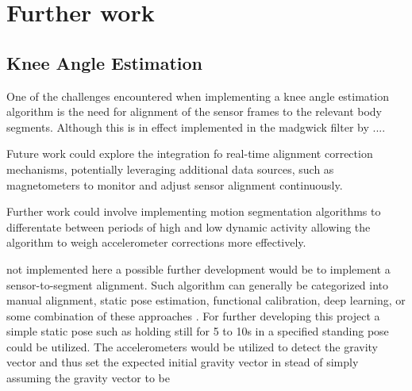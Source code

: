 
\section{Further work}

\subsection{Knee Angle Estimation}
One of the challenges encountered when implementing a knee angle estimation algorithm is the need for alignment of the sensor frames to the relevant body segments. Although this is in effect implemented in the madgwick filter by ....

Future work could explore the integration fo real-time alignment correction mechanisms, potentially leveraging additional data sources, such as magnetometers to monitor and adjust sensor alignment continuously.

Further work could involve implementing motion segmentation algorithms to differentate between periods of high and low dynamic activity allowing the algorithm to weigh accelerometer corrections more effectively.

not implemented here a possible further development would be to implement a sensor-to-segment alignment. Such algorithm can generally be categorized into manual alignment, static pose estimation, functional calibration, deep learning, or some combination of these approaches \cite{rhudy_knee_2024}. For further developing this project a simple static pose such as holding still for 5 to 10s in a specified standing pose could be utilized. The accelerometers would be utilized to detect the gravity vector and thus set the expected initial gravity vector in stead of simply assuming the gravity vector to be 

